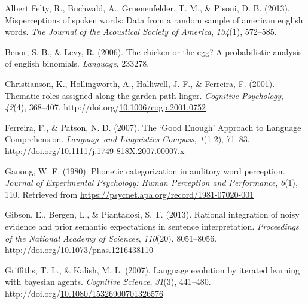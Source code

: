 \documentclass[10pt, letterpaper]{article}
\newenvironment{CSLReferences}%
  {}%
  {\par}
\begin{document}
\hypertarget{refs}{}
\begin{CSLReferences}{1}{0}
\leavevmode{}%
Albert Felty, R., Buchwald, A., Gruenenfelder, T. M., \& Pisoni, D. B.
(2013). Misperceptions of spoken words: Data from a random sample of
american english words. \emph{The Journal of the Acoustical Society of
America}, \emph{134}(1), 572--585.

\leavevmode{}%
Benor, S. B., \& Levy, R. (2006). The chicken or the egg? A
probabilistic analysis of english binomials. \emph{Language}, 233278.

\leavevmode{}%
Christianson, K., Hollingworth, A., Halliwell, J. F., \& Ferreira, F.
(2001). Thematic roles assigned along the garden path linger.
\emph{Cognitive Psychology}, \emph{42}(4), 368--407.
http://doi.org/\href{https://doi.org/10.1006/cogp.2001.0752}{10.1006/cogp.2001.0752}

\leavevmode{}%
Ferreira, F., \& Patson, N. D. (2007). The {`}Good Enough{'} Approach to
Language Comprehension. \emph{Language and Linguistics Compass},
\emph{1}(1-2), 71--83.
http://doi.org/\href{https://doi.org/10.1111/j.1749-818X.2007.00007.x}{10.1111/j.1749-818X.2007.00007.x}

\leavevmode{}%
Ganong, W. F. (1980). Phonetic categorization in auditory word
perception. \emph{Journal of Experimental Psychology: Human Perception
and Performance}, \emph{6}(1), 110. Retrieved from
\url{https://psycnet.apa.org/record/1981-07020-001}

\leavevmode{}%
Gibson, E., Bergen, L., \& Piantadosi, S. T. (2013). Rational
integration of noisy evidence and prior semantic expectations in
sentence interpretation. \emph{Proceedings of the National Academy of
Sciences}, \emph{110}(20), 8051--8056.
http://doi.org/\href{https://doi.org/10.1073/pnas.1216438110}{10.1073/pnas.1216438110}

\leavevmode{}%
Griffiths, T. L., \& Kalish, M. L. (2007). Language evolution by
iterated learning with bayesian agents. \emph{Cognitive Science},
\emph{31}(3), 441--480.
http://doi.org/\href{https://doi.org/10.1080/15326900701326576}{10.1080/15326900701326576}


\end{CSLReferences}
\end{document}
